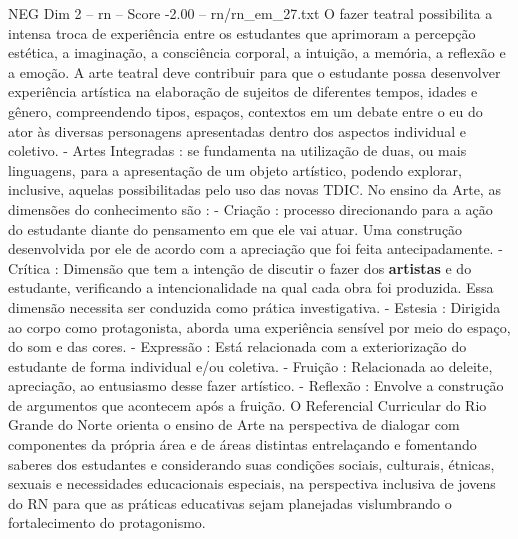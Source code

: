\begin{textsample}{NEG Dim 2 – rn – Score -2.00 – rn/rn\_em\_27.txt}
O fazer teatral possibilita a intensa troca de experiência entre os estudantes que aprimoram a percepção estética, a imaginação, a consciência corporal, a intuição, a memória, a reflexão e a emoção.
A arte teatral deve contribuir para que o estudante possa desenvolver experiência artística na elaboração de sujeitos de diferentes tempos, idades e gênero, compreendendo tipos, espaços, contextos em um debate entre o eu do ator às diversas personagens apresentadas dentro dos aspectos individual e coletivo. - Artes Integradas : se fundamenta na utilização de duas, ou mais linguagens, para a apresentação de um objeto artístico, podendo explorar, inclusive, aquelas possibilitadas pelo uso das novas TDIC.
No ensino da Arte, as dimensões do conhecimento são : - Criação : processo direcionando para a ação do estudante diante do pensamento em que ele vai atuar.
Uma construção desenvolvida por ele de acordo com a apreciação que foi feita antecipadamente. - Crítica : Dimensão que tem a intenção de discutir o fazer dos \textbf{artistas} e do estudante, verificando a intencionalidade na qual cada obra foi produzida.
Essa dimensão necessita ser conduzida como prática investigativa. - Estesia : Dirigida ao corpo como protagonista, aborda uma experiência sensível por meio do espaço, do som e das cores. - Expressão : Está relacionada com a exteriorização do estudante de forma individual e/ou coletiva. - Fruição : Relacionada ao deleite, apreciação, ao entusiasmo desse fazer artístico. - Reflexão : Envolve a construção de argumentos que acontecem após a fruição.
O Referencial Curricular do Rio Grande do Norte orienta o ensino de Arte na perspectiva de dialogar com componentes da própria área e de áreas distintas entrelaçando e fomentando saberes dos estudantes e considerando suas condições sociais, culturais, étnicas, sexuais e necessidades educacionais especiais, na perspectiva inclusiva de jovens do RN para que as práticas educativas sejam planejadas vislumbrando o fortalecimento do protagonismo.

\end{textsample}
